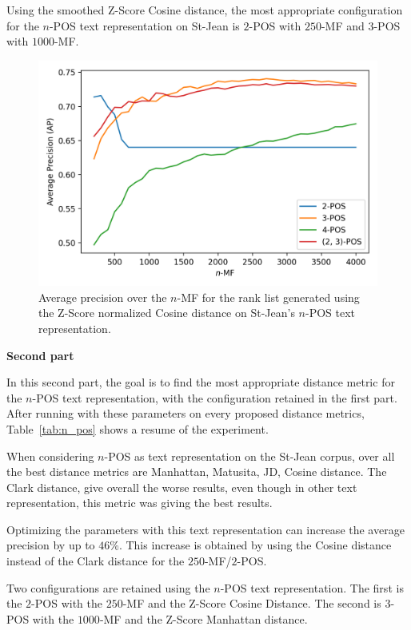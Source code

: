 Using the smoothed Z-Score Cosine distance, the most appropriate configuration for the $n$-POS text representation on St-Jean is $2$-POS with $250$-MF and $3$-POS with $1000$-MF.

\begin{figure}
  \centering
  \caption{Average precision over the $n$-MF for the rank list generated using the Z-Score normalized Cosine distance on St-Jean's $n$-POS text representation.}
  \label{fig:n_pos}
  \includegraphics[width=\linewidth]{img/n_pos.png}
\end{figure}

\textbf{Second part}

In this second part, the goal is to find the most appropriate distance metric for the $n$-POS text representation, with the configuration retained in the first part.
After running with these parameters on every proposed distance metrics, Table~\ref{tab:n_pos} shows a resume of the experiment.

When considering $n$-POS as text representation on the St-Jean corpus, over all the best distance metrics are Manhattan, Matusita, JD, Cosine distance.
The Clark distance, give overall the worse results, even though in other text representation, this metric was giving the best results.

Optimizing the parameters with this text representation can increase the average precision by up to $46$\%.
This increase is obtained by using the Cosine distance instead of the Clark distance for the $250$-MF/$2$-POS.


Two configurations are retained using the $n$-POS text representation.
The first is the $2$-POS with the $250$-MF and the Z-Score Cosine Distance.
The second is $3$-POS with the $1000$-MF and the Z-Score Manhattan distance.

